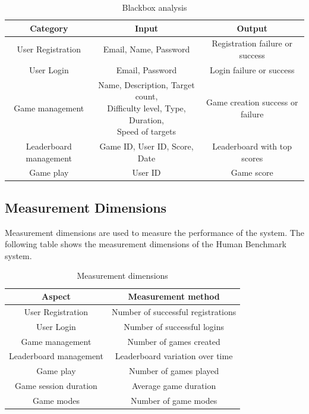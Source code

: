 \documentclass[]{VUMIFTemplateClass}
\begin{document}
\begin{table}[H]
    \centering
    \begin{tabular}{|c|c|c|}
        \hline
        \textbf{Category} & \textbf{Input} & \textbf{Output} \\
        \hline
        User Registration & Email, Name, Password & Registration failure or success  \\
        \hline
        User Login & Email, Password & Login failure or success \\
        \hline
        Game management & \makecell{Name, Description, Target count, \\ Difficulty level, Type, Duration, \\ Speed of targets} & Game creation success or failure \\
        \hline
        Leaderboard management & Game ID, User ID, Score, Date & Leaderboard with top scores \\
        \hline
        Game play & User ID & Game score \\
        \hline
    \end{tabular}
    \caption{Blackbox analysis}
    \label{tab:blackbox}
\end{table}

\subsection{Measurement Dimensions}
Measurement dimensions are used to measure the performance of the system. The following table shows the measurement dimensions of the Human Benchmark system.

\begin{table}[H]
    \centering
    \begin{tabular}{|c|c|}
        \hline
        \textbf{Aspect} & \textbf{Measurement method} \\
        \hline
        User Registration & Number of successful registrations \\
        \hline
        User Login & Number of successful logins \\
        \hline
        Game management & Number of games created \\
        \hline
        Leaderboard management & Leaderboard variation over time \\
        \hline
        Game play & Number of games played \\
        \hline
        Game session duration & Average game duration \\
        \hline
        Game modes & Number of game modes \\
        \hline
    \end{tabular}
    \caption{Measurement dimensions}
    \label{tab:measurement}
\end{table}
\end{document}
